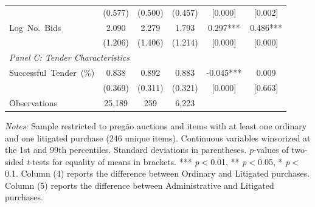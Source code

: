 \begin{table}[ht]
\begin{threeparttable}
\begin{tabular}{lccccc}
    & (0.577) & (0.500) & (0.457) & [0.000] & [0.002] \\[3pt]
    Log~No.~Bids & 2.090 & 2.279 & 1.793 & 0.297*** & 0.486*** \\
    & (1.206) & (1.406) & (1.214) & [0.000] & [0.000] \\[3pt]
    \hline
    \multicolumn{6}{l}{\textit{Panel C: Tender Characteristics}} \\[3pt]
    Successful~Tender~(\%) & 0.838 & 0.892 & 0.883 & -0.045*** & 0.009 \\
    & (0.369) & (0.311) & (0.321) & [0.000] & [0.663] \\[3pt]
    \hline
    Observations & 25,189 & 259 & 6,223 & & \\
    \hline\hline
  \end{tabular}
  \begin{tablenotes}
    \small
    \item \textit{Notes:} Sample restricted to preg\~ao auctions and items with at least one ordinary and one litigated purchase (246 unique items). Continuous variables winsorized at the 1st and 99th percentiles. Standard deviations in parentheses.
    \textit{p}-values of two-sided \textit{t}-tests for equality of means in brackets.
    *** \textit{p}$<$0.01, ** \textit{p}$<$0.05, * \textit{p}$<$0.1.
    Column (4) reports the difference between Ordinary and Litigated purchases.
    Column (5) reports the difference between Administrative and Litigated purchases.
  \end{tablenotes}
  \end{threeparttable}
\end{table}
